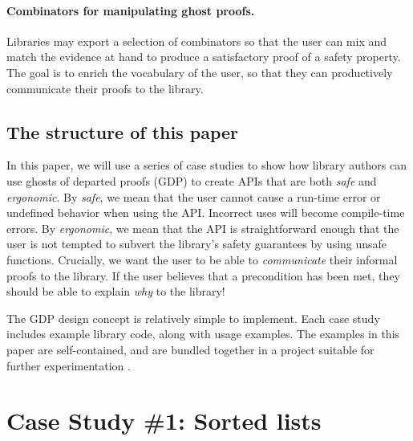 \documentclass[format=sigplan, review=false, screen=true]{acmart}
\begin{document}
\paragraph{Combinators for manipulating ghost proofs.}
  Libraries may export a selection of combinators so that the user can
  mix and match the evidence at hand to produce a satisfactory proof of a
  safety property. The goal is to enrich the vocabulary of the user, so
  that they can productively communicate their proofs to the library.


\subsection{The structure of this paper}
In this paper, we will use a series of case studies to show how library authors can use
ghosts of departed proofs (GDP) to create
APIs that are both \emph{safe} and \emph{ergonomic}. By \emph{safe}, we mean that the
user cannot cause a run-time error or undefined behavior when using the API. Incorrect uses
will become compile-time errors. By \emph{ergonomic}, we mean that the API is straightforward
enough that the user is not tempted to subvert the library's safety guarantees by using
unsafe functions. Crucially, we want the user to be able to \emph{communicate} their
informal proofs to the library. If the user believes that a precondition has been met,
they should be able to explain \emph{why} to the library!

The GDP design concept is relatively simple to implement. Each case study includes example library code,
along with usage examples. The examples in this paper are self-contained, and are bundled together in
a project suitable for further experimentation \cite{this}.


\section{Case Study \#1: Sorted lists}
\end{document}
